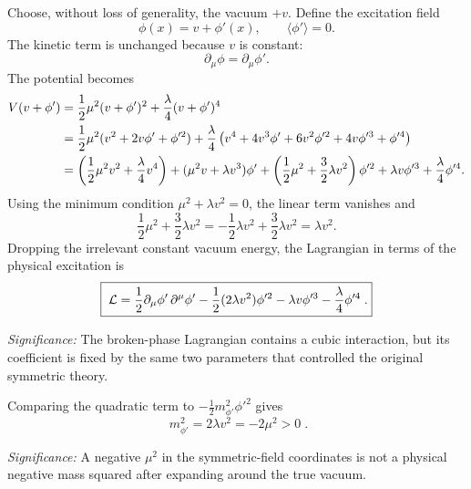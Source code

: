 Choose, without loss of generality, the vacuum $+v$. Define the excitation field
\begin{equation}
  \phi(x)=v+\phi'(x),
  \qquad
  \langle\phi'\rangle=0 .
  \label{eq:lec15:z2_shift}
\end{equation}
The kinetic term is unchanged because $v$ is constant:
\begin{equation}
  \partial_\mu\phi=\partial_\mu\phi' .
  \label{eq:lec15:z2_kinetic_shift}
\end{equation}
The potential becomes
\begin{align}
  V(v+\phi')
  &=\frac12\mu^2(v+\phi')^2+\frac{\lambda}{4}(v+\phi')^4
    \notag\\
  &=\frac12\mu^2(v^2+2v\phi'+\phi'^2)
    +\frac{\lambda}{4}
      \left(v^4+4v^3\phi'+6v^2\phi'^2+4v\phi'^3+\phi'^4\right)
    \notag\\
  &=\left(\frac12\mu^2v^2+\frac{\lambda}{4}v^4\right)
    +(\mu^2v+\lambda v^3)\phi'
    +\left(\frac12\mu^2+\frac32\lambda v^2\right)\phi'^2
    +\lambda v\phi'^3+\frac{\lambda}{4}\phi'^4 .
  \label{eq:lec15:z2_potential_expansion}
\end{align}
Using the minimum condition $\mu^2+\lambda v^2=0$, the linear term vanishes and
\begin{equation}
  \frac12\mu^2+\frac32\lambda v^2
  =-\frac12\lambda v^2+\frac32\lambda v^2
  =\lambda v^2 .
  \label{eq:lec15:z2_quadratic_coefficient}
\end{equation}
Dropping the irrelevant constant vacuum energy, the Lagrangian in terms of the physical excitation is
\begin{equation}
  \boxed{\;\mathcal{L}
  =\frac12\partial_\mu\phi'\,\partial^\mu\phi'
   -\frac12(2\lambda v^2)\phi'^2
   -\lambda v\phi'^3
   -\frac{\lambda}{4}\phi'^4\; .}
  \label{eq:lec15:z2_shifted_lagrangian}
\end{equation}

\textit{Significance:} The broken-phase Lagrangian contains a cubic interaction, but its coefficient is fixed by the same two parameters that controlled the original symmetric theory.

Comparing the quadratic term to $-\frac12m_{\phi'}^2\phi'^2$ gives
\begin{equation}
  \boxed{\;m_{\phi'}^2=2\lambda v^2=-2\mu^2>0\; .}
  \label{eq:lec15:z2_scalar_mass}
\end{equation}

\textit{Significance:} A negative $\mu^2$ in the symmetric-field coordinates is not a physical negative mass squared after expanding around the true vacuum.

